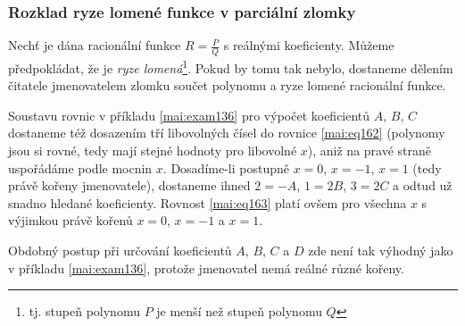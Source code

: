       
    \subsubsection{Rozklad ryze lomené funkce v parciální zlomky}
    Nechť je dána racionální funkce $R = \frac{P}{Q}$ s reálnými koeficienty. Můžeme
    předpokládat, že je \emph{ryze lomená}\footnote{tj. stupeň polynomu $P$ je menší než
    stupeň polynomu $Q$}. Pokud by tomu tak nebylo, dostaneme dělením čitatele jmenovatelem
    zlomku součet polynomu a ryze lomené racionální funkce.


    Soustavu rovnic v příkladu \eqref{mai:exam136} pro výpočet koeficientů \(A\), \(B\), \(C\)
    dostaneme též dosazením tří libovolných čísel do rovnice \ref{mai:eq162} (polynomy jsou si
    rovné, tedy mají stejné hodnoty pro libovolné \(x\)), aniž na pravé straně uspořádáme podle
    mocnin \(x\). Dosadíme-li postupně \(x=0\), \(x=-1\), \(x=1\) (tedy právě kořeny jmenovatele),
    dostaneme ihned \(2=-A\), \(1=2B\), \(3=2C\) a odtud už snadno hledané koeficienty. Rovnost
    \ref{mai:eq163} platí ovšem pro všechna \(x\) s výjimkou právě kořenů  \(x=0\), \(x=-1\) a
    \(x=1\).


    Obdobný postup při určování koeficientů \(A\), \(B\), \(C\) a \(D\) zde není tak výhodný jako
    v příkladu \eqref{mai:exam136}, protože jmenovatel nemá reálné různé kořeny. 


    
      

